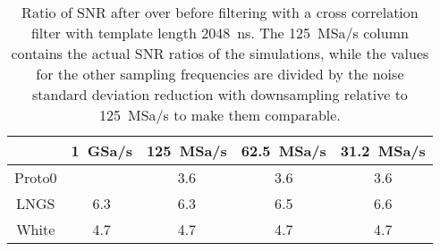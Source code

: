 \begin{table}
    \centering
    \begin{tabular}{c|cccc}
               & \SI{1}{GSa/s} & \SI{125}{MSa/s} & \SI{62.5}{MSa/s} & \SI{31.2}{MSa/s} \\ \hline
        Proto0 &               &             3.6 &              3.6 &              3.6 \\
          LNGS &           6.3 &             6.3 &              6.5 &              6.6 \\
         White &           4.7 &             4.7 &              4.7 &              4.7
    \end{tabular}
    
    \caption{Ratio of SNR after over before filtering with a cross correlation
    filter with template length \SI{2048}{ns}. The \SI{125}{MSa/s} column
    contains the actual SNR ratios of the simulations, while the values for the
    other sampling frequencies are divided by the noise standard deviation
    reduction with downsampling relative to \SI{125}{MSa/s} to make them
    comparable.}
    
    \label{tab:filtsnrdowns}
\end{table}

